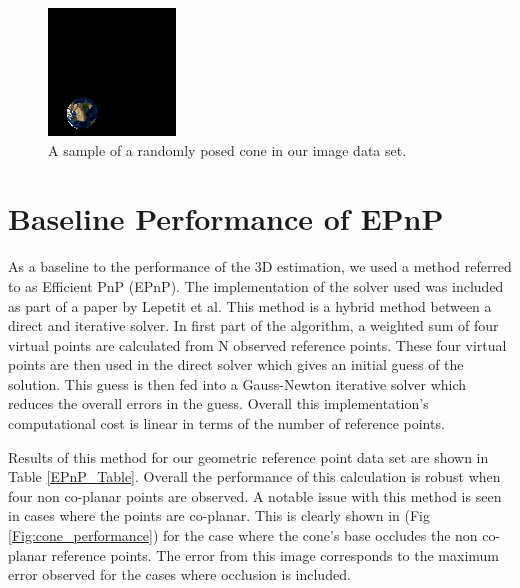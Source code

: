 \documentclass[journal]{IEEEtran}
\begin{document}
\begin{figure}[H]
	\hspace{-10 ex}

	\centering
	\includegraphics[width=.6\linewidth]{sphere_450}

	\caption{A sample of a randomly posed cone in our image data set.}
	\label{openglSphere}
\end{figure}

\section{Baseline Performance of EPnP}

 As a baseline to the performance of the 3D estimation, we used a method referred to as Efficient PnP (EPnP). The implementation of the solver used was included as part of a paper by Lepetit et al\cite{EPnP}. This method is a hybrid method between a direct and iterative solver. In first part of the algorithm, a weighted sum of four virtual points are calculated from N observed reference points. These four virtual points are then used in the direct solver which gives an initial guess of the solution. This guess is then fed into a Gauss-Newton iterative solver which reduces the overall errors in the guess. Overall this implementation's computational cost is linear in terms of the number of reference points.
 
 Results of this method for our geometric reference point data set are shown in Table \ref{EPnP_Table}. Overall the performance of this calculation is robust when four non co-planar points are observed. A notable issue with this method is seen in cases where the points are co-planar. This is clearly shown in (Fig \ref{Fig:cone_performance}) for the case where the cone's base occludes the non co-planar reference points. The error from this image corresponds to the maximum error observed for the cases where occlusion is included. 
 
\end{document}
